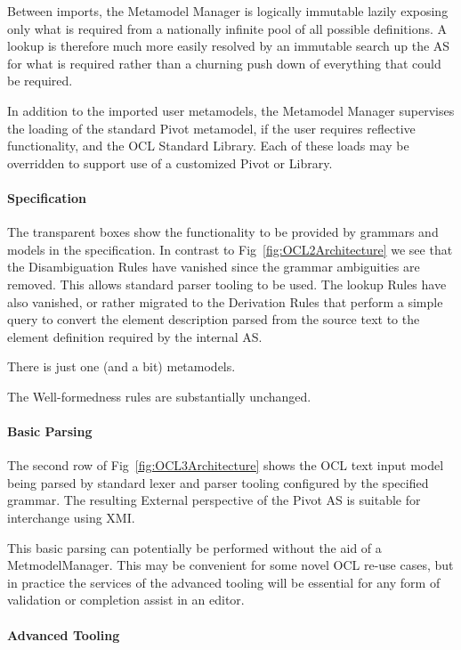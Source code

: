 \documentclass{jot}
\begin{document}
Between imports, the Metamodel Manager is logically immutable lazily exposing only what is required from a nationally infinite pool of all possible definitions. A lookup is therefore much more easily resolved by an immutable search up the AS for what is required rather than a churning push down of everything that could be required.

In addition to the imported user metamodels, the Metamodel Manager supervises the loading of the standard Pivot metamodel, if the user requires reflective functionality, and the OCL Standard Library. Each of these loads may be overridden to support use of a customized Pivot or Library.

\paragraph{Specification}

The transparent boxes show the functionality to be provided by grammars and models in the specification. In contrast to Fig~\ref{fig:OCL2Architecture} we see that the Disambiguation Rules have vanished since the grammar ambiguities are removed. This allows standard parser tooling to be used. The lookup Rules have also vanished, or rather migrated to the Derivation Rules that perform a simple query to convert the element description parsed from the source text to the element definition required by the internal AS.

There is just one (and a bit) metamodels.

The Well-formedness rules are substantially unchanged.

\paragraph{Basic Parsing}

The second row of Fig~\ref{fig:OCL3Architecture} shows the OCL text input model being parsed by standard lexer and parser tooling configured by the specified grammar. The resulting External perspective of the Pivot AS is suitable for interchange using XMI.

This basic parsing can potentially be performed without the aid of a MetmodelManager. This may be convenient for some novel OCL re-use cases, but in practice the services of the advanced tooling will be essential for any form of validation or completion assist in an editor.

\paragraph{Advanced Tooling}
\end{document}
